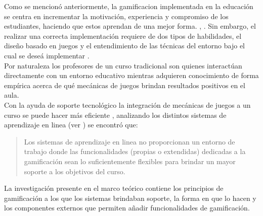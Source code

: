  Como se mencionó anteriormente, la \gls{gamificacion} implementada en la educación se centra
 en incrementar la motivación, experiencia y compromiso de los estudiantes, haciendo que estos
 aprendan de una mejor forma. \cite{GamInE-Learning}, \cite{Lee}.
 \noindent Sin embargo, el realizar una correcta implementación requiere de dos tipos de
 habilidades, el diseño basado en juegos y el entendimiento de las técnicas del entorno
 bajo el cual se deseá implementar \cite[p. 7]{ForTheWin}.\\

 \noindent Por naturaleza los profesores de un curso tradicional son quienes interactúan
 directamente con un entorno educativo mientras adquieren conocimiento de forma empírica
 acerca de qué mecánicas de juegos brindan resultados positivos en el aula.\\

 \noindent Con la ayuda de soporte tecnológico la integración de mecánicas de juegos a un
 curso se puede hacer más eficiente \cite{Wood-Reiners}, analizando los distintos sistemas de
 aprendizaje en linea (ver ) se encontró que:

    \begin{quote}
    \colorbox{blue!05}{\parbox{\dimexpr\linewidth-2\fboxsep}{\strut%
        Los sistemas de aprendizaje en linea no proporcionan un entorno
        de trabajo donde las funcionalidades (propias o extendidas) dedicadas
        a la gamificación sean lo suficientemente flexibles para brindar un
        mayor soporte a los objetivos del curso.
    \strut}}%
    \end{quote}

 \hfill \par
 \noindent La investigación presente en el marco teórico contiene los principios de gamificación
 a los que los sistemas brindaban soporte, la forma en que lo hacen y los componentes externos que
 permiten añadir funcionalidades de gamificación.




